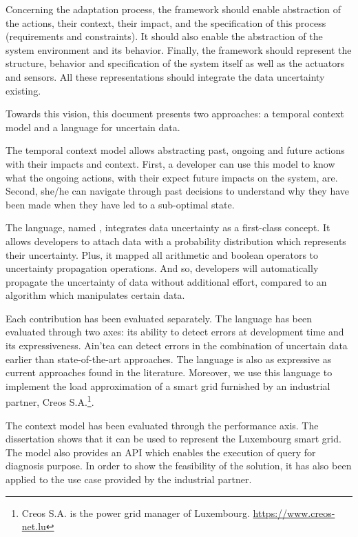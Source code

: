 Concerning the adaptation process, the framework should enable abstraction of the actions, their context, their impact, and the specification of this process (requirements and constraints).
It should also enable the abstraction of the system environment and its behavior.
Finally, the framework should represent the structure, behavior and specification of the system itself as well as the actuators and sensors.
All these representations should integrate the data uncertainty existing.

\bigskip
{}
Towards this vision, this document presents two approaches: a temporal context model and a language for uncertain data.

The temporal context model allows abstracting past, ongoing and future actions with their impacts and context.
First, a developer can use this model to know what the ongoing actions, with their expect future impacts on the system, are.
Second, she/he can navigate through past decisions to understand why they have been made when they have led to a sub-optimal state.

The language, named \langName, integrates data uncertainty as a first-class concept.
It allows developers to attach data with a probability distribution which represents their uncertainty.
Plus, it mapped all arithmetic and boolean operators to uncertainty propagation operations. 
And so, developers will automatically propagate the uncertainty of data without additional effort, compared to an algorithm which manipulates certain data.

\bigskip
{}
Each contribution has been evaluated separately. 
The language has been evaluated through two axes: its ability to detect errors at development time and its expressiveness.
Ain'tea can detect errors in the combination of uncertain data earlier than state-of-the-art approaches.
The language is also as expressive as current approaches found in the literature.
Moreover, we use this language to implement the load approximation of a smart grid furnished by an industrial partner, Creos S.A.\footnote{Creos S.A. is the power grid manager of Luxembourg. \url{https://www.creos-net.lu}}.

The context model has been evaluated through the performance axis.
The dissertation shows that it can be used to represent the Luxembourg smart grid.
The model also provides an API which enables the execution of query for diagnosis purpose.
In order to show the feasibility of the solution, it has also been applied to the use case provided by the industrial partner.

\bigskip
\bigskip
\bigskip
{}


